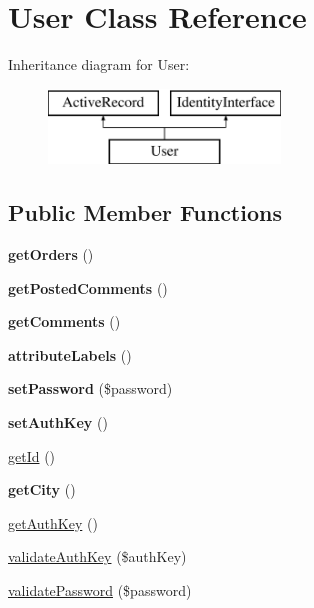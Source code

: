 \hypertarget{classapp_1_1models_1_1_user}{}\section{User Class Reference}
\label{classapp_1_1models_1_1_user}
Inheritance diagram for User\+:\begin{figure}[H]
\begin{center}
\leavevmode
\includegraphics[height=2.000000cm]{classapp_1_1models_1_1_user}
\end{center}
\end{figure}
\subsection*{Public Member Functions}
\begin{DoxyCompactItemize}
\item 
\hypertarget{classapp_1_1models_1_1_user_a46794631cd74bd5fd20eedf24ac938d4}{}\label{classapp_1_1models_1_1_user_a46794631cd74bd5fd20eedf24ac938d4} 
{\bfseries get\+Orders} ()
\item 
\hypertarget{classapp_1_1models_1_1_user_adb49d249de40ebb2d6ef60cf2f4bcab3}{}\label{classapp_1_1models_1_1_user_adb49d249de40ebb2d6ef60cf2f4bcab3} 
{\bfseries get\+Posted\+Comments} ()
\item 
\hypertarget{classapp_1_1models_1_1_user_af3034ead082330d2c046a69814009808}{}\label{classapp_1_1models_1_1_user_af3034ead082330d2c046a69814009808} 
{\bfseries get\+Comments} ()
\item 
\hypertarget{classapp_1_1models_1_1_user_aae54d2938df6eac42a9a9020a64ae31b}{}\label{classapp_1_1models_1_1_user_aae54d2938df6eac42a9a9020a64ae31b} 
{\bfseries attribute\+Labels} ()
\item 
\hypertarget{classapp_1_1models_1_1_user_a3e35c8d3dbb2c513c618a664389e0926}{}\label{classapp_1_1models_1_1_user_a3e35c8d3dbb2c513c618a664389e0926} 
{\bfseries set\+Password} (\$password)
\item 
\hypertarget{classapp_1_1models_1_1_user_af86ba25ce1d7339d53bf28828aa3b29e}{}\label{classapp_1_1models_1_1_user_af86ba25ce1d7339d53bf28828aa3b29e} 
{\bfseries set\+Auth\+Key} ()
\item 
\hyperlink{classapp_1_1models_1_1_user_a12251d0c022e9e21c137a105ff683f13}{get\+Id} ()
\item 
\hypertarget{classapp_1_1models_1_1_user_ae9ca906fce6e9fe5fab3a6b42209d6a1}{}\label{classapp_1_1models_1_1_user_ae9ca906fce6e9fe5fab3a6b42209d6a1} 
{\bfseries get\+City} ()
\item 
\hyperlink{classapp_1_1models_1_1_user_a16828b12b5cf4522cb93f64c2b1af43b}{get\+Auth\+Key} ()
\item 
\hyperlink{classapp_1_1models_1_1_user_a54be63849d3e4d8db0fd23142cbc2a69}{validate\+Auth\+Key} (\$auth\+Key)
\item 
\hyperlink{classapp_1_1models_1_1_user_a179b92fbda1d7688a44cdcebf0b50e3f}{validate\+Password} (\$password)
\end{DoxyCompactItemize}
